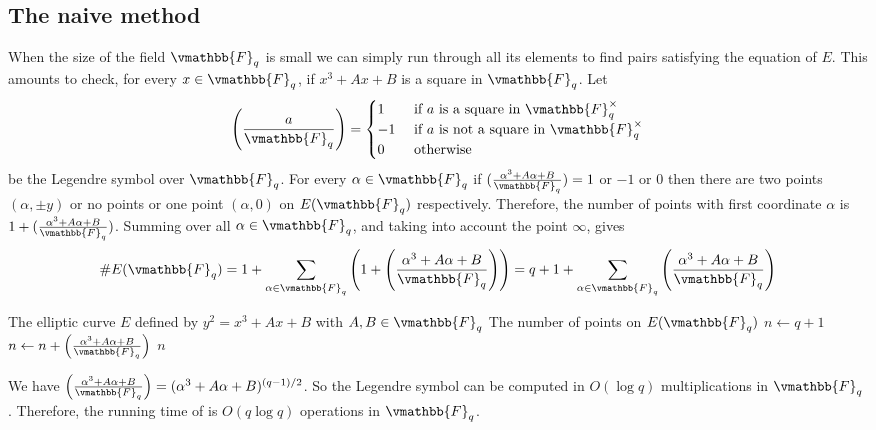 \subsection{The naive method}

When the size of the field $\vmathbb{F}_q$ is small we can simply run through all its elements to 
find pairs satisfying the equation of $E$. This amounts to check, for every $x \in \vmathbb{F}_q$, if 
$x^3 + Ax + B$ is a square in $\vmathbb{F}_q$. Let 
$$
\left(\frac{a}{\vmathbb{F}_q}\right) =
\begin{cases}
1 & \text{ if } a \text{ is a square in } \vmathbb{F}_q^{\times}\\
-1 & \text{ if } a \text{ is not a square in } \vmathbb{F}_q^{\times}\\
0 & \text{ otherwise}
\end{cases}
$$
be the Legendre symbol over $\vmathbb{F}_q$. For every $\alpha \in \vmathbb{F}_q$ if $(\frac{\alpha^3 
+ A\alpha + B}{\vmathbb{F}_q}) = 1$ or $-1$ or $0$ then there are two points $(\alpha, \pm y)$ or no 
points or one point $(\alpha, 0)$ on $E(\vmathbb{F}_q)$ respectively. Therefore, the number of points 
with first coordinate $\alpha$ is $1 + (\frac{\alpha^3 + A\alpha + B}{\vmathbb{F}_q})$. Summing over 
all $\alpha \in \vmathbb{F}_q$, and taking into account the point $\infty$, gives
$$
\#E(\vmathbb{F}_q) = 1 + \sum_{\alpha \in \vmathbb{F}_q} \left(1 + \left( \frac{\alpha^3 + A\alpha + 
B}{\vmathbb{F}_q} \right) \right) = q + 1 + \sum_{\alpha \in \vmathbb{F}_q} \left( \frac{\alpha^3 + 
A\alpha + B}{\vmathbb{F}_q} \right)
$$

\begin{algorithm}
\label{algorithm:naive-count}
\begin{algorithmic}[1]
\REQUIRE The elliptic curve $E$ defined by $y^2 = x^3 + Ax + B$ with $A, B \in \vmathbb{F}_q$
\ENSURE  The number of points on $E(\vmathbb{F}_q)$
\STATE $n \leftarrow q + 1$
	\STATE $n \leftarrow n + \left( \frac{\alpha^3 + A\alpha + B}{\vmathbb{F}_q} \right)$
\ENDFOR
\RETURN $n$
\end{algorithmic}
\end{algorithm}

We have $\left( \frac{\alpha^3 + A\alpha + B}{\vmathbb{F}_q} \right) = (\alpha^3 + A\alpha + B)^{(q - 
1) / 2}$. So the Legendre symbol can be computed in $O(\log q)$ multiplications in $\vmathbb{F}_q$. 
Therefore, the running time of  is $O(q\log q)$ operations in 
$\vmathbb{F}_q$.



